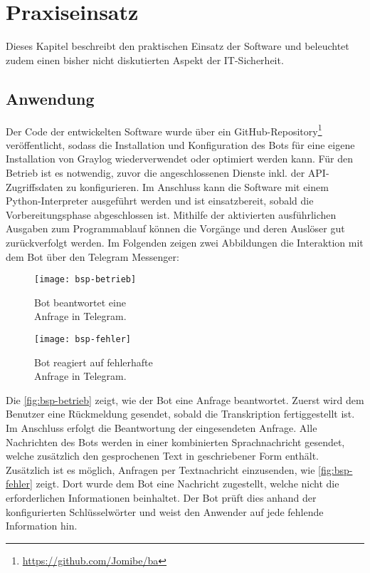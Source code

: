 \chapter{Praxiseinsatz}
\label{cha:praxiseinsatz}

Dieses Kapitel beschreibt den praktischen Einsatz der Software und beleuchtet zudem einen bisher nicht diskutierten Aspekt der IT-Sicherheit.

\section{Anwendung}

Der Code der entwickelten Software wurde über ein GitHub-Repository\footnote{\url{https://github.com/Jomibe/ba}} veröffentlicht, sodass die Installation und Konfiguration des Bots für eine eigene Installation von Graylog wiederverwendet oder optimiert werden kann. Für den Betrieb ist es notwendig, zuvor die angeschlossenen Dienste inkl. der API-Zugriffsdaten zu konfigurieren. Im Anschluss kann die Software mit einem Python-Interpreter ausgeführt werden und ist einsatzbereit, sobald die Vorbereitungsphase abgeschlossen ist. Mithilfe der aktivierten ausführlichen Ausgaben zum Programmablauf können die Vorgänge und deren Auslöser gut zurückverfolgt werden. Im Folgenden zeigen zwei Abbildungen die Interaktion mit dem Bot über den Telegram Messenger:

\begin{figure}[h!]
    \centering
    \begin{minipage}{0.5\textwidth}
        \raggedright
        \texttt{[image: bsp-betrieb]}
        \caption{Bot beantwortet eine \\\hspace{\textwidth}Anfrage in Telegram.}
        \label{fig:bsp-betrieb}
    \end{minipage}\hfill
    \begin{minipage}{0.5\textwidth}
        \raggedleft
        \texttt{[image: bsp-fehler]}
        \caption{Bot reagiert auf fehlerhafte \\\hspace{\textwidth}Anfrage in Telegram.}
        \label{fig:bsp-fehler}
    \end{minipage}
\end{figure}

Die \autoref{fig:bsp-betrieb} zeigt, wie der Bot eine Anfrage beantwortet. Zuerst wird dem Benutzer eine Rückmeldung gesendet, sobald die Transkription fertiggestellt ist. Im Anschluss erfolgt die Beantwortung der eingesendeten Anfrage. Alle Nachrichten des Bots werden in einer kombinierten Sprachnachricht gesendet, welche zusätzlich den gesprochenen Text in geschriebener Form enthält. Zusätzlich ist es möglich, Anfragen per Textnachricht einzusenden, wie \autoref{fig:bsp-fehler} zeigt. Dort wurde dem Bot eine Nachricht zugestellt, welche nicht die erforderlichen Informationen beinhaltet. Der Bot prüft dies anhand der konfigurierten Schlüsselwörter und weist den Anwender auf jede fehlende Information hin. 

